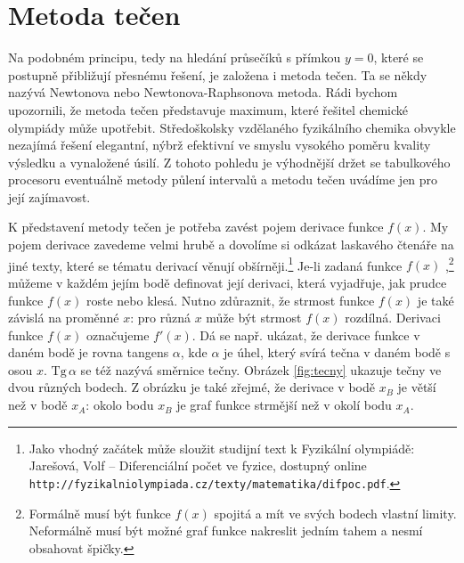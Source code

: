 \documentclass[a4paper,oneside,12pt]{article}
\begin{document}
\section{Metoda tečen}

Na podobném principu, tedy na hledání průsečíků s přímkou
$y=0$, které se
postupně přibližují přesnému řešení, je založena i metoda tečen.
Ta se někdy nazývá Newtonova nebo Newtonova-Raphsonova metoda.
Rádi bychom upozornili, že metoda tečen představuje maximum, které
řešitel chemické olympiády může upotřebit. Středoškolsky vzdělaného
fyzikálního chemika obvykle nezajímá řešení elegantní, nýbrž 
efektivní ve smyslu vysokého poměru kvality výsledku a
vynaložené úsilí. Z tohoto pohledu je výhodnější držet se tabulkového 
procesoru eventuálně metody půlení intervalů a metodu tečen 
uvádíme jen pro její zajímavost.

K představení metody tečen je potřeba zavést pojem derivace
funkce $f(x)$. My pojem derivace zavedeme velmi hrubě a dovolíme
si odkázat laskavého čtenáře na jiné texty, které se tématu 
derivací věnují obšírněji.\footnote{Jako vhodný začátek může 
sloužit studijní text k Fyzikální olympiádě: Jarešová, 
Volf -- Diferenciální počet ve fyzice, dostupný online 
\texttt{http://fyzikalniolympiada.cz/texty/matematika/difpoc.pdf}.}
Je-li zadaná funkce $f(x)$ 
,\footnote{Formálně musí být funkce $f(x)$
spojitá a mít ve svých bodech vlastní limity. Neformálně musí být
možné graf funkce nakreslit jedním tahem a nesmí obsahovat 
špičky.} můžeme v každém jejím bodě definovat 
její derivaci, která vyjadřuje, jak prudce funkce $f(x)$ roste nebo 
klesá. Nutno zdůraznit, že strmost funkce $f(x)$ je také závislá na
proměnné $x$: pro různá $x$ může být strmost $f(x)$ rozdílná. Derivaci 
funkce $f(x)$ označujeme $f'(x)$. Dá se např. ukázat, že derivace 
funkce v daném bodě je rovna tangens $\alpha$, kde $\alpha$ je úhel,
který svírá tečna v daném bodě s osou $x$. $\mathrm{Tg\,} \alpha$ se též 
nazývá směrnice tečny. Obrázek \ref{fig:tecny} ukazuje tečny ve dvou různých
bodech. Z obrázku je také zřejmé, že derivace v bodě $x_B$ je
větší než v bodě $x_A$: okolo bodu $x_B$ je graf funkce
strmější než v okolí bodu $x_A$.
\end{document}
